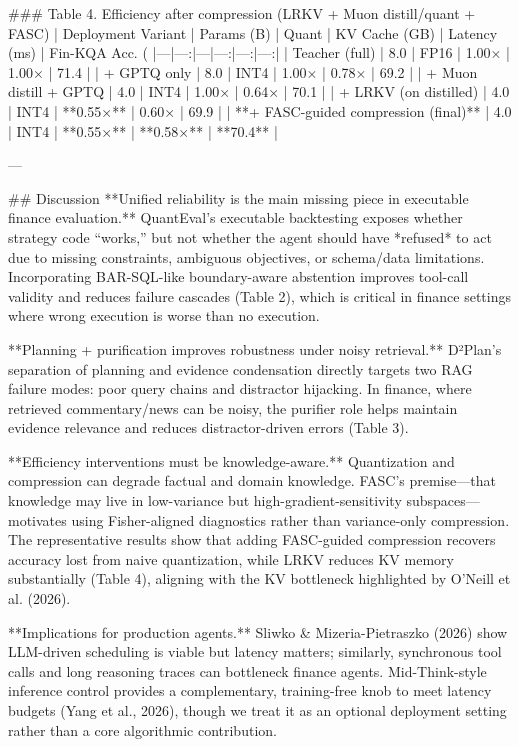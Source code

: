 ### Table 4. Efficiency after compression (LRKV + Muon distill/quant + FASC)
| Deployment Variant | Params (B) | Quant | KV Cache (GB) | Latency (ms) | Fin-KQA Acc. (%
|---|---:|---|---:|---:|---:|
| Teacher (full) | 8.0 | FP16 | 1.00× | 1.00× | 71.4 |
| + GPTQ only | 8.0 | INT4 | 1.00× | 0.78× | 69.2 |
| + Muon distill + GPTQ | 4.0 | INT4 | 1.00× | 0.64× | 70.1 |
| + LRKV (on distilled) | 4.0 | INT4 | **0.55×** | 0.60× | 69.9 |
| **+ FASC-guided compression (final)** | 4.0 | INT4 | **0.55×** | **0.58×** | **70.4** |

---

## Discussion  
**Unified reliability is the main missing piece in executable finance evaluation.** QuantEval’s executable backtesting exposes whether strategy code “works,” but not whether the agent should have *refused* to act due to missing constraints, ambiguous objectives, or schema/data limitations. Incorporating BAR-SQL-like boundary-aware abstention improves tool-call validity and reduces failure cascades (Table 2), which is critical in finance settings where wrong execution is worse than no execution.

**Planning + purification improves robustness under noisy retrieval.** D²Plan’s separation of planning and evidence condensation directly targets two RAG failure modes: poor query chains and distractor hijacking. In finance, where retrieved commentary/news can be noisy, the purifier role helps maintain evidence relevance and reduces distractor-driven errors (Table 3).

**Efficiency interventions must be knowledge-aware.** Quantization and compression can degrade factual and domain knowledge. FASC’s premise—that knowledge may live in low-variance but high-gradient-sensitivity subspaces—motivates using Fisher-aligned diagnostics rather than variance-only compression. The representative results show that adding FASC-guided compression recovers accuracy lost from naive quantization, while LRKV reduces KV memory substantially (Table 4), aligning with the KV bottleneck highlighted by O’Neill et al. (2026).

**Implications for production agents.** Sliwko & Mizeria-Pietraszko (2026) show LLM-driven scheduling is viable but latency matters; similarly, synchronous tool calls and long reasoning traces can bottleneck finance agents. Mid-Think-style inference control provides a complementary, training-free knob to meet latency budgets (Yang et al., 2026), though we treat it as an optional deployment setting rather than a core algorithmic contribution.

